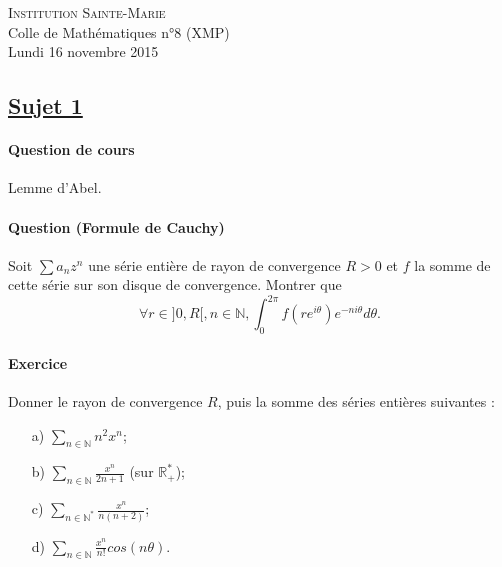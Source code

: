 \documentclass[12pt,a4paper]{report}
\begin{document}
\newcommand{\rA}{\mathcal{A}}
\newcommand{\rB}{\mathcal{B}}
\newcommand{\rC}{\mathcal{C}}
\newcommand{\rG}{\mathcal{G}}
\newcommand{\rF}{\mathcal{F}}
\newcommand{\rO}{\mathcal{O}}
\newcommand{\rP}{\mathcal{P}}
\newcommand{\rH}{\mathcal{H}}
\newcommand{\rR}{\mathcal{R}}
\newcommand{\rE}{\mathcal{E}}
\newcommand{\rL}{\mathcal{L}}
\newcommand{\rM}{\mathcal{M}}
\newcommand{\bK}{\mathbb{K}}
\newcommand{\bQ}{\mathbb{Q}}
\newcommand{\bR}{\mathbb{R}}
\newcommand{\bZ}{\mathbb{Z}}
\newcommand{\bN}{\mathbb{N}}
\newcommand{\bC}{\mathbb{C}}
\newcommand{\bP}{\mathbb{P}}
\newcommand{\bF}{\mathbb{F}}

\ifpdf
{}
\else
{}
\fi

\pagestyle{empty} %

\noindent \textsc{Institution Sainte-Marie}\\
Colle de Mathématiques n°8 (XMP)\\
Lundi 16 novembre 2015


\subsection*{\underline{Sujet 1}}

\paragraph*{Question de cours}
Lemme d'Abel.

\paragraph*{Question (Formule de Cauchy)} Soit $\sum a_nz^n$ une série entière de rayon de convergence $R>0$ et $f$ la somme de cette série sur son disque de convergence. Montrer que 
$$\forall r\in ]0,R[, n\in\bN, \int_0^{2\pi}f(re^{i\theta})e^{-ni\theta}d\theta.$$

\paragraph*{Exercice}
Donner le rayon de convergence $R$, puis la somme des séries entières suivantes :
\begin{itemize}
\item[a)] $\sum\limits_{n\in\bN}n^2x^n$;
\item[b)] $\sum\limits_{n\in\bN}\frac{x^n}{2n+1}$ (sur $\bR_+^*$);
\item[c)] $\sum\limits_{n\in\bN^*}\frac{x^n}{n(n+2)}$;
\item[d)] $\sum\limits_{n\in\bN}\frac{x^n}{n!}cos(n\theta)$.
\end{itemize}
\end{document}
